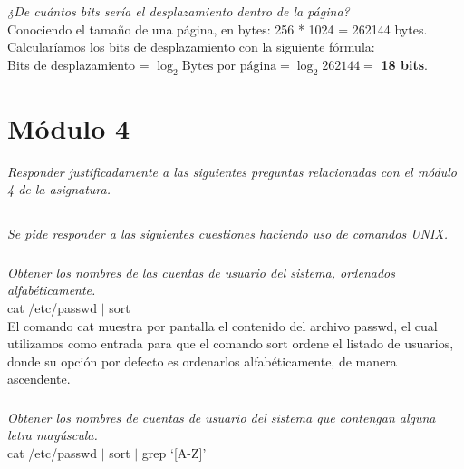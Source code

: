 \documentclass[spanish]{article}
\begin{document}
\textit{¿De cuántos bits sería el desplazamiento dentro de
la página?}\\

Conociendo el tamaño de una página, en bytes: 256 * 1024 =
262144 bytes.\\

Calcularíamos los bits de desplazamiento con la siguiente
fórmula:\\

Bits de desplazamiento = \(\log_{2} \textrm{Bytes por
página} = \log_{2} 262144 = \) \textbf{18 bits}.

\newpage

\section{Módulo 4}

\textit{Responder justificadamente a las siguientes
preguntas relacionadas con el módulo 4 de la asignatura.}

\subsection{}

\textit{Se pide responder a las siguientes cuestiones
haciendo uso de comandos UNIX.}

\subsubsection{}

\textit{Obtener los nombres de las cuentas de usuario del
sistema, ordenados alfabéticamente.}\\

cat /etc/passwd $\vert$ sort\\

El comando cat muestra por pantalla el contenido del archivo
passwd, el cual utilizamos como entrada para que el comando
sort ordene el listado de usuarios, donde su opción por
defecto es ordenarlos alfabéticamente, de manera ascendente.

\subsubsection{}

\textit{Obtener los nombres de cuentas de usuario del
sistema que contengan alguna letra mayúscula.}\\

cat /etc/passwd $\vert$ sort $\vert$ grep `[A-Z]'\\
\end{document}
